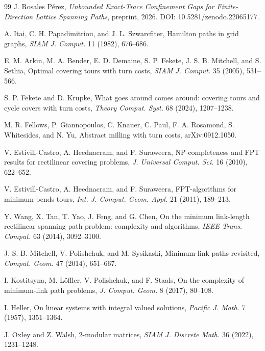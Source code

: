 \documentclass[11pt]{article}
\theoremstyle{definition}
\begin{document}
\begin{thebibliography}{99}
J. Rosales P\'erez,
\emph{Unbounded Exact-Trace Confinement Gaps for Finite-Direction Lattice Spanning Paths},
preprint, 2026. DOI: 10.5281/zenodo.22065177.

A. Itai, C. H. Papadimitriou, and J. L. Szwarcfiter,
Hamilton paths in grid graphs,
\emph{SIAM J. Comput.} 11 (1982), 676--686.

E. M. Arkin, M. A. Bender, E. D. Demaine, S. P. Fekete, J. S. B. Mitchell, and S. Sethia,
Optimal covering tours with turn costs,
\emph{SIAM J. Comput.} 35 (2005), 531--566.

S. P. Fekete and D. Krupke,
What goes around comes around: covering tours and cycle covers with turn costs,
\emph{Theory Comput. Syst.} 68 (2024), 1207--1238.

M. R. Fellows, P. Giannopoulos, C. Knauer, C. Paul, F. A. Rosamond, S. Whitesides, and N. Yu,
Abstract milling with turn costs,
arXiv:0912.1050.

V. Estivill-Castro, A. Heednacram, and F. Suraweera,
NP-completeness and FPT results for rectilinear covering problems,
\emph{J. Universal Comput. Sci.} 16 (2010), 622--652.

V. Estivill-Castro, A. Heednacram, and F. Suraweera,
FPT-algorithms for minimum-bends tours,
\emph{Int. J. Comput. Geom. Appl.} 21 (2011), 189--213.

Y. Wang, X. Tan, T. Yao, J. Feng, and G. Chen,
On the minimum link-length rectilinear spanning path problem: complexity and algorithms,
\emph{IEEE Trans. Comput.} 63 (2014), 3092--3100.

J. S. B. Mitchell, V. Polishchuk, and M. Sysikaski,
Minimum-link paths revisited,
\emph{Comput. Geom.} 47 (2014), 651--667.

I. Kostitsyna, M. L\"offler, V. Polishchuk, and F. Staals,
On the complexity of minimum-link path problems,
\emph{J. Comput. Geom.} 8 (2017), 80--108.

I. Heller,
On linear systems with integral valued solutions,
\emph{Pacific J. Math.} 7 (1957), 1351--1364.

J. Oxley and Z. Walsh,
2-modular matrices,
\emph{SIAM J. Discrete Math.} 36 (2022), 1231--1248.
\end{thebibliography}
\end{document}
